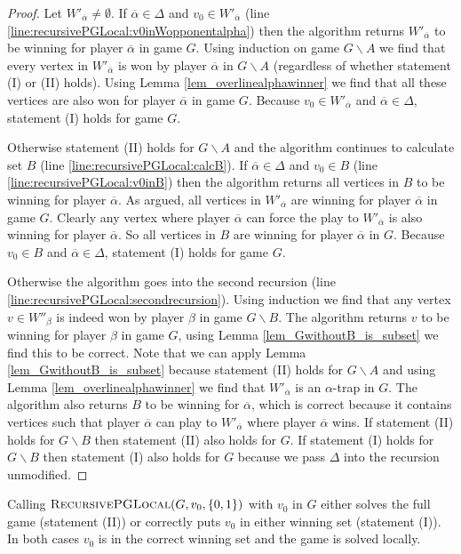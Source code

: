 \begin{theorem}
\begin{proof}
			Let $W'_{\overline{\alpha}} \neq \emptyset$. If $\overline{\alpha} \in \Delta$ and $v_0 \in W'_{\overline{\alpha}}$ (line \ref{line:recursivePGLocal:v0inWopponentalpha}) then the algorithm returns $W'_{\overline{\alpha}}$ to be winning for player $\overline{\alpha}$ in game $G$. Using induction on game $G \backslash A$ we find that every vertex in $W'_{\overline{\alpha}}$ is won by player $\overline{\alpha}$ in $G \backslash A$ (regardless of whether statement (I) or (II) holds). Using Lemma \ref{lem_overlinealphawinner} we find that all these vertices are also won for player $\overline{\alpha}$ in game $G$. Because $v_0 \in W'_{\overline{\alpha}}$ and $\overline{\alpha} \in \Delta$, statement (I) holds for game $G$.
			
			Otherwise statement (II) holds for $G\backslash A$ and the algorithm continues to calculate set $B$ (line \ref{line:recursivePGLocal:calcB}). If $\overline{\alpha} \in \Delta$ and $v_0 \in B$ (line \ref{line:recursivePGLocal:v0inB}) then the algorithm returns all vertices in $B$ to be winning for player $\overline{\alpha}$. As argued, all vertices in $W'_{\overline{\alpha}}$ are winning for player $\overline{\alpha}$ in game $G$. Clearly any vertex where player $\overline{\alpha}$ can force the play to $W'_{\overline{\alpha}}$ is also winning for player $\overline{\alpha}$. So all vertices in $B$ are winning for player $\overline{\alpha}$ in $G$. Because $v_0 \in B$ and $\overline{\alpha} \in \Delta$, statement (I) holds for game $G$.
			
			Otherwise the algorithm goes into the second recursion (line \ref{line:recursivePGLocal:secondrecursion}). Using induction we find that any vertex $v \in W''_\beta$ is indeed won by player $\beta$ in game $G\backslash B$. The algorithm returns $v$ to be winning for player $\beta$ in game $G$, using Lemma \ref{lem_GwithoutB_is_subset} we find this to be correct. Note that we can apply Lemma \ref{lem_GwithoutB_is_subset} because statement (II) holds for $G\backslash A$ and using Lemma \ref{lem_overlinealphawinner} we find that $W'_{\overline{\alpha}}$ is an $\alpha$-trap in $G$. The algorithm also returns $B$ to be winning for $\overline{\alpha}$, which is correct because it contains vertices such that player $\overline{\alpha}$ can play to $W'_{\overline{\alpha}}$ where player $\overline{\alpha}$ wins. If statement (II) holds for $G\backslash B$ then statement (II) also holds for $G$. If statement (I) holds for $G\backslash B$ then statement (I) also holds for $G$ because we pass $\Delta$ into the recursion unmodified.
		\end{proof}
\end{theorem}
Calling $\textsc{RecursivePGLocal}(G, v_0, \{0,1\})$ with $v_0$ in $G$ either solves the full game (statement (II)) or correctly puts $v_0$ in either winning set (statement (I)). In both cases $v_0$ is in the correct winning set and the game is solved locally.

